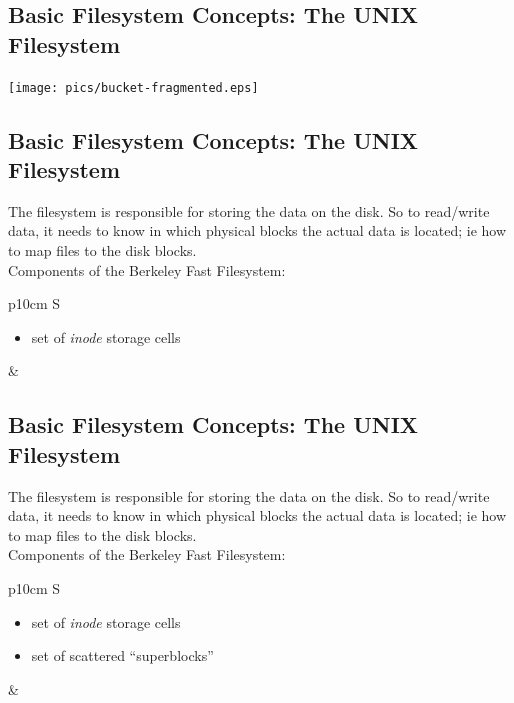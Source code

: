 \documentclass[xga]{xdvislides}
\begin{document}
\subsection{Basic Filesystem Concepts: The UNIX Filesystem}
\vspace*{\fill}
\begin{center}
\texttt{[image: pics/bucket-fragmented.eps]} \\
\end{center}
\vspace*{\fill}

\subsection{Basic Filesystem Concepts: The UNIX Filesystem}
The filesystem is responsible for storing the data on the disk.
So to read/write data, it needs to know in which physical blocks the actual
data is located; ie how to map files to the disk blocks.
\\

Components of the Berkeley Fast Filesystem:
\\

\begin{tabular}{ p{10cm} S }
\begin{itemize}
	\item set of {\em inode} storage cells
\end{itemize}
&  \\
\end{tabular}

\subsection{Basic Filesystem Concepts: The UNIX Filesystem}
The filesystem is responsible for storing the data on the disk.
So to read/write data, it needs to know in which physical blocks the actual
data is located; ie how to map files to the disk blocks.
\\

Components of the Berkeley Fast Filesystem:
\\

\begin{tabular}{ p{10cm} S }
\begin{itemize}
	\item set of {\em inode} storage cells
	\item set of scattered ``superblocks''
\end{itemize}
&  \\
\end{tabular}
\end{document}
